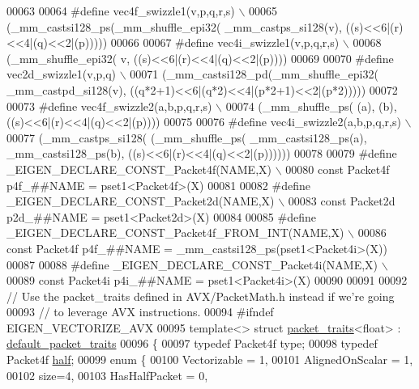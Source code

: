 \begin{DoxyCode}
00063 
00064 \textcolor{preprocessor}{#define vec4f\_swizzle1(v,p,q,r,s) \(\backslash\)}
00065 \textcolor{preprocessor}{  (\_mm\_castsi128\_ps(\_mm\_shuffle\_epi32( \_mm\_castps\_si128(v), ((s)<<6|(r)<<4|(q)<<2|(p)))))}
00066 
00067 \textcolor{preprocessor}{#define vec4i\_swizzle1(v,p,q,r,s) \(\backslash\)}
00068 \textcolor{preprocessor}{  (\_mm\_shuffle\_epi32( v, ((s)<<6|(r)<<4|(q)<<2|(p))))}
00069 
00070 \textcolor{preprocessor}{#define vec2d\_swizzle1(v,p,q) \(\backslash\)}
00071 \textcolor{preprocessor}{  (\_mm\_castsi128\_pd(\_mm\_shuffle\_epi32( \_mm\_castpd\_si128(v), ((q*2+1)<<6|(q*2)<<4|(p*2+1)<<2|(p*2)))))}
00072   
00073 \textcolor{preprocessor}{#define vec4f\_swizzle2(a,b,p,q,r,s) \(\backslash\)}
00074 \textcolor{preprocessor}{  (\_mm\_shuffle\_ps( (a), (b), ((s)<<6|(r)<<4|(q)<<2|(p))))}
00075 
00076 \textcolor{preprocessor}{#define vec4i\_swizzle2(a,b,p,q,r,s) \(\backslash\)}
00077 \textcolor{preprocessor}{  (\_mm\_castps\_si128( (\_mm\_shuffle\_ps( \_mm\_castsi128\_ps(a), \_mm\_castsi128\_ps(b),
       ((s)<<6|(r)<<4|(q)<<2|(p))))))}
00078 
00079 \textcolor{preprocessor}{#define \_EIGEN\_DECLARE\_CONST\_Packet4f(NAME,X) \(\backslash\)}
00080 \textcolor{preprocessor}{  const Packet4f p4f\_##NAME = pset1<Packet4f>(X)}
00081 
00082 \textcolor{preprocessor}{#define \_EIGEN\_DECLARE\_CONST\_Packet2d(NAME,X) \(\backslash\)}
00083 \textcolor{preprocessor}{  const Packet2d p2d\_##NAME = pset1<Packet2d>(X)}
00084 
00085 \textcolor{preprocessor}{#define \_EIGEN\_DECLARE\_CONST\_Packet4f\_FROM\_INT(NAME,X) \(\backslash\)}
00086 \textcolor{preprocessor}{  const Packet4f p4f\_##NAME = \_mm\_castsi128\_ps(pset1<Packet4i>(X))}
00087 
00088 \textcolor{preprocessor}{#define \_EIGEN\_DECLARE\_CONST\_Packet4i(NAME,X) \(\backslash\)}
00089 \textcolor{preprocessor}{  const Packet4i p4i\_##NAME = pset1<Packet4i>(X)}
00090 
00091 
00092 \textcolor{comment}{// Use the packet\_traits defined in AVX/PacketMath.h instead if we're going}
00093 \textcolor{comment}{// to leverage AVX instructions.}
00094 \textcolor{preprocessor}{#ifndef EIGEN\_VECTORIZE\_AVX}
00095 \textcolor{keyword}{template}<> \textcolor{keyword}{struct }\hyperlink{struct_eigen_1_1internal_1_1packet__traits}{packet\_traits}<float>  : \hyperlink{struct_eigen_1_1internal_1_1default__packet__traits}{default\_packet\_traits}
00096 \{
00097   \textcolor{keyword}{typedef} Packet4f type;
00098   \textcolor{keyword}{typedef} Packet4f \hyperlink{struct_eigen_1_1half}{half};
00099   \textcolor{keyword}{enum} \{
00100     Vectorizable = 1,
00101     AlignedOnScalar = 1,
00102     size=4,
00103     HasHalfPacket = 0,

\end{DoxyCode}
